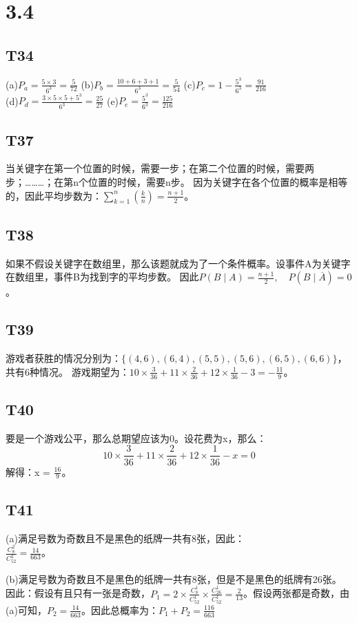 \documentclass{article}
\begin{document}
\section{3.4}
\subsection{T34}
(a)$P_a = \frac{5 \times 3}{6^3} = \frac{5}{72}$ \quad
(b)$P_b = \frac{10 + 6 + 3 + 1}{6^3} = \frac{5}{54}$ \quad
(c)$P_c = 1 - \frac{5^3}{6^3} = \frac{91}{216}$\\
(d)$P_d = \frac{3 \times 5 \times 5 + 5^3}{6^3} = \frac{25}{27}$ \quad
(e)$P_e = \frac{5^3}{6^3} = \frac{125}{216}$
\subsection{T37}
当关键字在第一个位置的时候，需要一步；在第二个位置的时候，需要两步；………；在第n个位置的时候，需要n步。
因为关键字在各个位置的概率是相等的，因此平均步数为：$\sum_{k = 1}^{n}\left(\frac{k}{n}\right) = \frac{n + 1}{2}$。
\subsection{T38}
如果不假设关键字在数组里，那么该题就成为了一个条件概率。设事件A为关键字在数组里，事件B为找到字的平均步数。
因此$P(B \mid A) = \frac{n + 1}{2}, \quad P(B \mid \overline{A}) = 0$。
\subsection{T39}
游戏者获胜的情况分别为：$\{(4, 6), (6, 4), (5, 5), (5, 6), (6, 5), (6, 6)\}$，共有6种情况。
游戏期望为：$10 \times \frac{3}{36} + 11 \times \frac{2}{36} + 12 \times \frac{1}{36} - 3 = -\frac{11}{9}$。
\subsection{T40}
要是一个游戏公平，那么总期望应该为0。设花费为x，那么：
\[10 \times \frac{3}{36} + 11 \times \frac{2}{36} + 12 \times \frac{1}{36} - x = 0\]
解得：x = $\frac{16}{9}$。
\subsection{T41}
(a)满足号数为奇数且不是黑色的纸牌一共有8张，因此：\\
$\frac{C_{8}^2}{C_{52}^2} = \frac{14}{663}$。

(b)满足号数为奇数且不是黑色的纸牌一共有8张，但是不是黑色的纸牌有26张。
因此：假设有且只有一张是奇数，$P_1 = 2 \times \frac{C_{8}^1}{C_{52}^1} \times \frac{C_{26}^1}{C_{52}^1} = 
\frac{2}{13}$。假设两张都是奇数，由(a)可知，$P_2 = \frac{14}{663}$。因此总概率为：$P_1 + P_2 = \frac{116}{663}$
\end{document}
